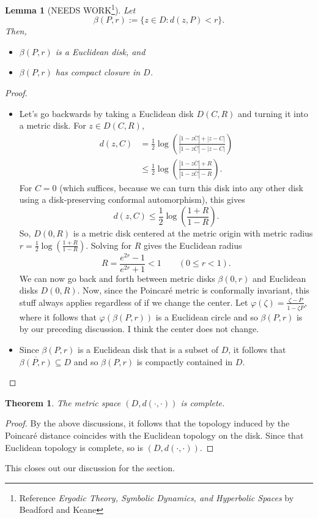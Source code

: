\documentclass[10pt]{article}
\theoremstyle{plain}
\newtheorem{theorem}{Theorem}
\newtheorem{lemma}{Lemma}
\begin{document}
		\begin{lemma}[NEEDS WORK\footnote{Reference \textit{Ergodic Theory, Symbolic Dynamics, and Hyperbolic Spaces} by Beadford and Keane}] Let $$\beta(P, r) := \{z \in D : d(z, P) < r\}.$$ Then,
			\begin{itemize}
				\item[(1)] $\beta(P, r)$ is a Euclidean disk, and
				
				\item[(2)] $\beta(P, r)$ has compact closure in $D$. 
 			\end{itemize}
		\end{lemma}
		\begin{proof} ~
			\begin{itemize}
				\item[(1)] Let's go backwards by taking a Euclidean disk $D(C, R)$ and turning it into a metric disk. For $z \in D(C, R)$, 
					\begin{align*}
						d(z, C) &= \frac{1}{2} \log \left(\frac{|1 - z \overline{C}| + |z - C|}{|1 - z \overline{C}| - |z - C|}\right) \\
						&\leq \frac{1}{2} \log \left(\frac{|1 - z \overline{C}| + R}{|1 - z \overline{C}| - R}\right).
					\end{align*}
				For $C = 0$ (which suffices, because we can turn this disk into any other disk using a disk-preserving conformal automorphism), this gives $$d(z, C) \leq \frac{1}{2} \log\left(\frac{1 + R}{1 - R}\right).$$ So, $D(0, R)$ is a metric disk centered at the metric origin with metric radius $r = \frac{1}{2} \log \left(\frac{1 + R}{1 - R}\right)$. Solving for $R$ gives the Euclidean radius $$R = \frac{e^{2r} - 1}{e^{2r} + 1} < 1 \qquad (0 \leq r < 1).$$ We can now go back and forth between metric disks $\beta(0, r)$ and Euclidean disks $D(0, R)$. Now, since the Poincaré metric is conformally invariant, this stuff always applies regardless of if we change the center. Let $\varphi(\zeta) = \frac{\zeta - P}{1 - \zeta \overline{P}}$, where it follows that $\varphi(\beta(P, r))$ is a Euclidean circle and so $\beta(P, r)$ is by our preceding discussion. I think the center does not change. 
				\item[(2)] Since $\beta(P, r)$ is a Euclidean disk that is a subset of $D$, it follows that $\overline{\beta(P, r)} \subseteq D$ and so $\beta(P, r)$ is compactly contained in $D$.  
			\end{itemize}
		\end{proof}
		
		
		\begin{theorem}
			The metric space $(D, d(\cdot, \cdot))$ is complete.
		\end{theorem}
		\begin{proof}
			By the above discussions, it follows that the topology induced by the Poincaré distance coincides with the Euclidean topology on the disk. Since that Euclidean topology is complete, so is $(D, d(\cdot, \cdot))$. 
		\end{proof}
	
This closes out our discussion for the section.
\end{document}
